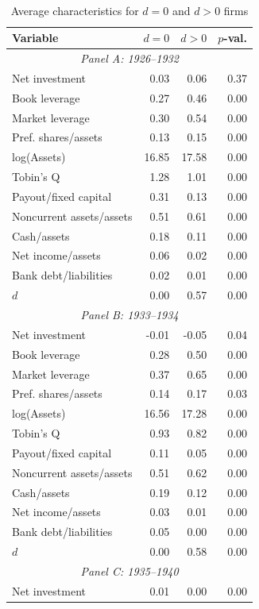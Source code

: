 \begin{table}[p]
\centering
\caption{\\ Average characteristics for $d = 0$ and $d > 0$ firms} \scriptsize \label{tab:sum_diff}
\begin{tabular}{lrrr}
\toprule
Variable & $d=0$ & $d>0$ & $p$-val.\\
\midrule
\multicolumn{4}{c}{\emph{Panel A: 1926--1932}}\\
\midrule
Net investment & 0.03 & 0.06 & 0.37 \\
Book leverage & 0.27 & 0.46 & 0.00 \\
Market leverage & 0.30 & 0.54 & 0.00 \\
Pref. shares/assets & 0.13 & 0.15 & 0.00 \\
log(Assets) & 16.85 & 17.58 & 0.00 \\
Tobin's Q & 1.28 & 1.01 & 0.00 \\
Payout/fixed capital & 0.31 & 0.13 & 0.00 \\
Noncurrent assets/assets & 0.51 & 0.61 & 0.00 \\
Cash/assets & 0.18 & 0.11 & 0.00 \\
Net income/assets & 0.06 & 0.02 & 0.00 \\
Bank debt/liabilities & 0.02 & 0.01 & 0.00 \\
$d$ & 0.00 & 0.57 & 0.00 \\
\midrule
\multicolumn{4}{c}{\emph{Panel B: 1933--1934}}\\
\midrule
Net investment & -0.01 & -0.05 & 0.04 \\
Book leverage & 0.28 & 0.50 & 0.00 \\
Market leverage & 0.37 & 0.65 & 0.00 \\
Pref. shares/assets & 0.14 & 0.17 & 0.03 \\
log(Assets) & 16.56 & 17.28 & 0.00 \\
Tobin's Q & 0.93 & 0.82 & 0.00 \\
Payout/fixed capital & 0.11 & 0.05 & 0.00 \\
Noncurrent assets/assets & 0.51 & 0.62 & 0.00 \\
Cash/assets & 0.19 & 0.12 & 0.00 \\
Net income/assets & 0.03 & 0.01 & 0.00 \\
Bank debt/liabilities & 0.05 & 0.00 & 0.00 \\
$d$ & 0.00 & 0.58 & 0.00 \\
\midrule
\multicolumn{4}{c}{\emph{Panel C: 1935--1940}}\\
\midrule
Net investment & 0.01 & 0.00 & 0.00 \\

\end{tabular}
\end{table}
